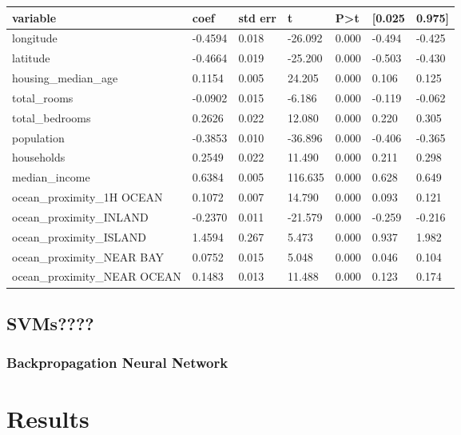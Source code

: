 \documentclass[11pt]{article}
\begin{document}
\begin{table}
\centering
\begin{tabular}{|l|l|l|l|l|l|l|} 
\hline
\textbf{variable} & \textbf{coef} & \textbf{std err} & \textbf{t} & \textbf{P\textgreater{}\textbar{}t\textbar{}} & \textbf{[0.025} & \textbf{0.975]} \\ 
\hline
longitude & -0.4594 & 0.018 & -26.092 & 0.000 & -0.494 & -0.425 \\ 
\hline
latitude & -0.4664 & 0.019 & -25.200 & 0.000 & -0.503 & -0.430 \\ 
\hline
housing\_median\_age & 0.1154 & 0.005 & 24.205 & 0.000 & 0.106 & 0.125 \\ 
\hline
total\_rooms & -0.0902 & 0.015 & -6.186 & 0.000 & -0.119 & -0.062 \\ 
\hline
total\_bedrooms & 0.2626 & 0.022 & 12.080 & 0.000 & 0.220 & 0.305 \\ 
\hline
population & -0.3853 & 0.010 & -36.896 & 0.000 & -0.406 & -0.365 \\ 
\hline
households & 0.2549 & 0.022 & 11.490 & 0.000 & 0.211 & 0.298 \\ 
\hline
median\_income & 0.6384 & 0.005 & 116.635 & 0.000 & 0.628 & 0.649 \\ 
\hline
ocean\_proximity\_1H OCEAN & 0.1072 & 0.007 & 14.790 & 0.000 & 0.093 & 0.121 \\ 
\hline
ocean\_proximity\_INLAND & -0.2370 & 0.011 & -21.579 & 0.000 & -0.259 & -0.216 \\ 
\hline
ocean\_proximity\_ISLAND & 1.4594 & 0.267 & 5.473 & 0.000 & 0.937 & 1.982 \\ 
\hline
ocean\_proximity\_NEAR BAY & 0.0752 & 0.015 & 5.048 & 0.000 & 0.046 & 0.104 \\ 
\hline
ocean\_proximity\_NEAR OCEAN & 0.1483 & 0.013 & 11.488 & 0.000 & 0.123 & 0.174 \\
\hline
\end{tabular}
\end{table}

\subsection{SVMs????}

\subsubsection{Backpropagation Neural Network}

\section{Results}
\end{document}
